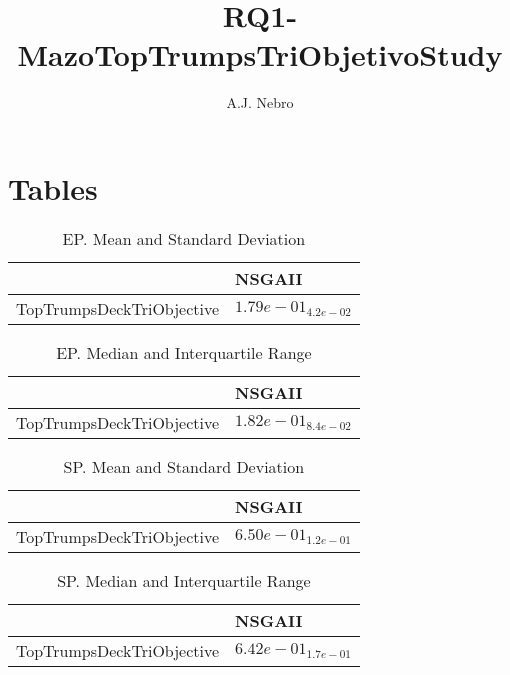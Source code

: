\documentclass{article}
\title{RQ1-MazoTopTrumpsTriObjetivoStudy}
\author{A.J. Nebro}
\begin{document}
\maketitle
\section{Tables}

\begin{table}
\caption{EP. Mean and Standard Deviation}
\label{table: EP}
\centering
\begin{scriptsize}
\begin{tabular}{ll}
\hline &  NSGAII\\
\hline 
TopTrumpsDeckTriObjective & \cellcolor{gray95}$  1.79e-01_{ 4.2e-02}$ \\
\hline
\end{tabular}
\end{scriptsize}
\end{table}

\begin{table}
\caption{EP. Median and Interquartile Range}
\label{table: EP}
\centering
\begin{scriptsize}
\begin{tabular}{ll}
\hline &  NSGAII\\
\hline 
TopTrumpsDeckTriObjective & \cellcolor{gray95}$  1.82e-01_{ 8.4e-02}$ \\
\hline
\end{tabular}
\end{scriptsize}
\end{table}

\begin{table}
\caption{SP. Mean and Standard Deviation}
\label{table: SP}
\centering
\begin{scriptsize}
\begin{tabular}{ll}
\hline &  NSGAII\\
\hline 
TopTrumpsDeckTriObjective & \cellcolor{gray95}$  6.50e-01_{ 1.2e-01}$ \\
\hline
\end{tabular}
\end{scriptsize}
\end{table}

\begin{table}
\caption{SP. Median and Interquartile Range}
\label{table: SP}
\centering
\begin{scriptsize}
\begin{tabular}{ll}
\hline &  NSGAII\\
\hline 
TopTrumpsDeckTriObjective & \cellcolor{gray95}$  6.42e-01_{ 1.7e-01}$ \\
\hline
\end{tabular}
\end{scriptsize}
\end{table}
\end{document}
